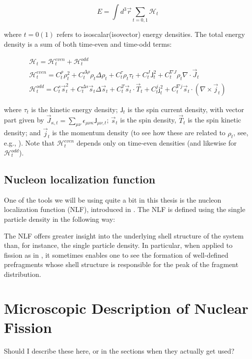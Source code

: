 \begin{equation}
E = \int d^3\vec{r}\sum_{t=0,1}\mathcal{H}_t
\end{equation}

\noindent where $t=0(1)$ refers to isoscalar(isovector) energy densities. The total energy density is a sum of both time-even and time-odd terms:

\begin{eqnarray}
\mathcal{H}_t = \mathcal{H}^{even}_t + \mathcal{H}^{odd}_t \\
\mathcal{H}^{even}_t = C^\rho_t\rho_t^2 + C_t^{\Delta\rho}\rho_t\Delta\rho_t + C^\tau_t\rho_t\tau_t + C^J_t\mathsf{J}^2_t + C^{\nabla J}_t\rho_t\nabla\cdot\vec{J}_t \\
\mathcal{H}^{odd}_t = C^s_t \vec{s}_t^2 + C_t^{\Delta s}\vec{s}_t\Delta\vec{s}_t + C^T_t\vec{s}_t\cdot\vec{T}_t + C^j_t\mathsf{j}^2_t + C^{\nabla j}_t\vec{s}_t\cdot(\nabla\times\vec{j}_t)
\end{eqnarray}

\noindent where $\tau_t$ is the kinetic energy density; $\mathsf{J}_t$ is the spin current density, with vector part given by $\vec{J}_{\kappa,t} = \sum_{\mu\nu}\epsilon_{\mu\nu\kappa}\mathsf{J}_{\mu\nu,t}$; $\vec{s}_t$ is the spin density, $\vec{T}_t$ is the spin kinetic density; and $\vec{j}_t$ is the momentum density (to see how these are related to $\rho_t$, see, e.g., \cite{Bender2003}). Note that $\mathcal{H}^{even}_t$ depends only on time-even densities (and likewise for $\mathcal{H}^{odd}_t$).

\subsection{Nucleon localization function}
One of the tools we will be using quite a bit in this thesis is the nucleon localization function (NLF), introduced in \cite{Zhang2016}. The NLF is defined using the single particle density in the following way:


The NLF offers greater insight into the underlying shell structure of the system than, for instance, the single particle density. In particular, when applied to fission as in \cite{Sadhukhan2017}, it sometimes enables one to see the formation of well-defined prefragments whose shell structure is responsible for the peak of the fragment distribution.

\section{Microscopic Description of Nuclear Fission}
Should I describe these here, or in the sections when they actually get used?


